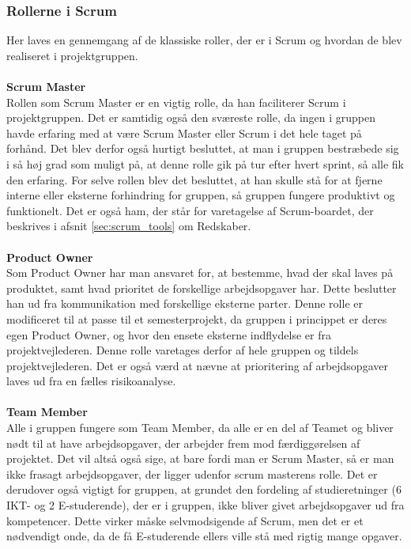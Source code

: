 \documentclass[a4paper,12pt,fleqn,oneside]{article}
\begin{document}
\subsubsection{Rollerne i Scrum}
Her laves en gennemgang af de klassiske roller, der er i Scrum og hvordan de blev realiseret i projektgruppen. 
\\\\\textbf{Scrum Master}
\\Rollen som Scrum Master er en vigtig rolle, da han faciliterer Scrum i projektgruppen. Det er samtidig også den sværeste rolle, da ingen i gruppen havde erfaring med at være Scrum Master eller Scrum i det hele taget på forhånd. Det blev derfor også hurtigt besluttet, at man i gruppen bestræbede sig i så høj grad som muligt på, at denne rolle gik på tur efter hvert sprint, så alle fik den erfaring. For selve rollen blev det besluttet, at han skulle stå for at fjerne interne eller eksterne forhindring for gruppen, så gruppen fungere produktivt og funktionelt. Det er også ham, der står for varetagelse af Scrum-boardet, der beskrives i afsnit \ref{sec:scrum_tools} om Redskaber.
\\\\\textbf{Product Owner}
\\Som Product Owner har man ansvaret for, at bestemme, hvad der skal laves på produktet, samt hvad prioritet de forskellige arbejdsopgaver har. Dette beslutter han ud fra kommunikation med forskellige eksterne parter. Denne rolle er modificeret til at passe til et semesterprojekt, da gruppen i princippet er deres egen Product Owner, og hvor den ensete eksterne indflydelse er fra projektvejlederen. Denne rolle varetages derfor af hele gruppen og tildels projektvejlederen. Det er også værd at nævne at prioritering af arbejdsopgaver laves ud fra en fælles risikoanalyse.
\\\\\textbf{Team Member}
\\Alle i gruppen fungere som Team Member, da alle er en del af Teamet og bliver nødt til at have arbejdsopgaver, der arbejder frem mod færdiggørelsen af projektet. Det vil altså også sige, at bare fordi man er Scrum Master, så er man ikke frasagt arbejdsopgaver, der ligger udenfor scrum masterens rolle. Det er derudover også vigtigt for gruppen, at grundet den fordeling af studieretninger  (6 IKT- og 2 E-studerende), der er i gruppen, ikke bliver givet arbejdsopgaver ud fra kompetencer. Dette virker måske selvmodsigende af Scrum, men det er et nødvendigt onde, da de få E-studerende ellers ville stå med rigtig mange opgaver.
\end{document}
